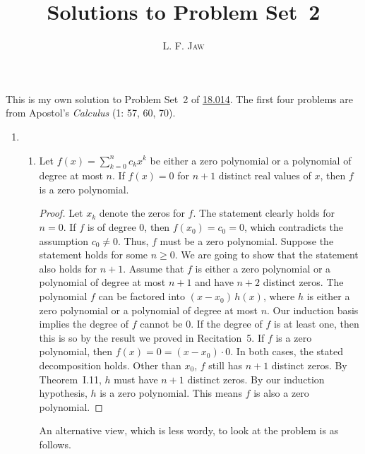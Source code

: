 \documentclass[a4paper]{article}
\title{Solutions to Problem Set~2}
\author{L. F. \textsc{Jaw}}
\begin{document}
\maketitle

This is my own solution to Problem Set~2 of
\href{https://ocw.mit.edu/courses/mathematics/18-014-calculus-with-theory-fall-2010/assignments/}{18.014}.
The first four problems are from Apostol's \textit{Calculus} (1: 57, 60, 70).

\begin{enumerate}
\item
  \begin{enumerate}
  \item Let \(f(x) = \sum_{k=0}^n c_k x^k\) be either a zero polynomial or a
    polynomial of degree at most \(n\).  If \(f(x) = 0\) for \(n+1\)
    distinct real values of \(x\), then \(f\) is a zero polynomial.

    \begin{proof}
      Let \(x_k\) denote the zeros for \(f\).  The statement clearly holds for
      \(n=0\).  If \(f\) is of degree \(0\), then \(f(x_0) = c_0 = 0\), which
      contradicts the assumption \(c_0 \ne 0\).  Thus, \(f\) must be a zero
      polynomial.  Suppose the statement holds for some \(n \ge 0\).  We are
      going to show that the statement also holds for \(n+1\).  Assume that
      \(f\) is either a zero polynomial or a polynomial of degree at most
      \(n+1\) and have \(n+2\) distinct zeros.  The polynomial \(f\) can be
      factored into \((x-x_0) \, h(x)\), where \(h\) is either a zero
      polynomial or a polynomial of degree at most \(n\).  Our induction basis
      implies the degree of \(f\) cannot be \(0\).  If the degree of \(f\) is
      at least one, then this is so by the result we proved in Recitation~5.
      If \(f\) is a zero polynomial, then \(f(x) = 0 = (x-x_0) \cdot 0\).  In
      both cases, the stated decomposition holds.  Other than \(x_0\), \(f\)
      still has \(n+1\) distinct zeros.  By Theorem~I.11, \(h\) must have
      \(n+1\) distinct zeros.  By our induction hypothesis, \(h\) is a zero
      polynomial.  This means \(f\) is also a zero polynomial.
    \end{proof}

    An alternative view, which is less wordy, to look at the problem is as
    follows.


\end{enumerate}
\end{enumerate}
\end{document}
